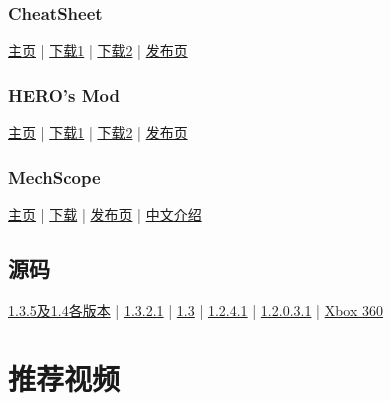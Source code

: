 \subsection{CheatSheet}\label{app5}
\href{https://github.com/JavidPack/CheatSheet}{主页} | \href{http://javid.ddns.net/tModLoader/download.php?Down=mods/CheatSheet.tmod}{下载1} | \href{https://github.com/JavidPack/CheatSheet/releases}{下载2} | \href{https://forums.terraria.org/index.php?threads/cheat-sheet.41407/}{发布页}

\subsection{HERO's Mod}\label{app6}
\href{https://github.com/JavidPack/HEROsMod}{主页} | \href{http://javid.ddns.net/tModLoader/download.php?Down=mods/HEROsMod.tmod}{下载1} | \href{https://github.com/JavidPack/HEROsMod/releases}{下载2} | \href{https://forums.terraria.org/index.php?threads/heros-mod-creative-mode-server-management-and-over-25-tools-1-3-4-4-compatible.44650/}{发布页}

\subsection{MechScope}\label{app7}
\href{https://github.com/DRKV333/MechScope}{主页} | \href{https://github.com/DRKV333/MechScope/releases/}{下载} | \href{https://forums.terraria.org/index.php?threads/mechscope-wiring-visualized.70665/}{发布页} | \href{https://www.bilibili.com/read/cv2222687}{中文介绍}

\section{源码}\label{app8}
\href{https://github.com/Pryaxis/Sources}{1.3.5及1.4各版本} | \href{https://github.com/NoviaDroid/TerrariaRefractoring_1.3.2.1}{1.3.2.1} | \href{https://github.com/saniainf/EDTerraria}{1.3} | \href{https://github.com/EdgeKiller/terrariaSource}{1.2.4.1} | \href{https://github.com/TheVamp/Terraria-Source-Code}{1.2.0.3.1} | \href{https://github.com/dptug/TerrariaXDK}{Xbox 360}

\chapter{推荐视频}

